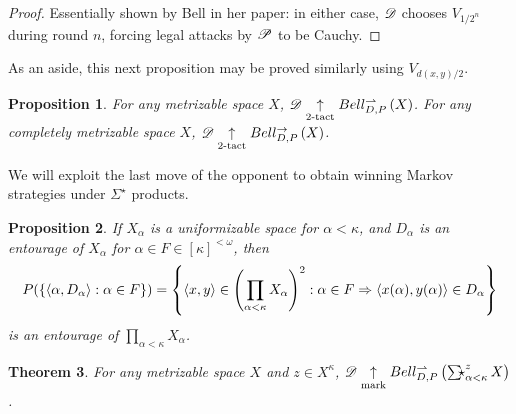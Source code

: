 \documentclass{amsart}
\newtheorem{theorem}{Theorem}[section]
\newtheorem{proposition}[theorem]{Proposition}
\theoremstyle{definition}
\begin{document}
  \begin{proof}
    Essentially shown by Bell in her paper: in either case,
    \(\mathscr{D}\) chooses \(V_{1/2^{n}}\)
    during round \(n\), forcing legal attacks by \(\mathscr{P}\) to be Cauchy.
  \end{proof}

  As an aside, this next proposition may be proved similarly
  using \(V_{d(x,y)/2}\).

  \begin{proposition}
    For any metrizable space \(X\),
    \(\mathscr{D}\underset{2\text{-tact}}{\uparrow}Bell_{D,P}^{\rightharpoonup}\left({X}\right)\).
    For any completely metrizable space \(X\),
    \(\mathscr{D}\underset{2\text{-tact}}{\uparrow}Bell_{D,P}^{\to}\left({X}\right)\).
  \end{proposition}

  We will exploit the last move of the
  opponent to obtain winning Markov strategies under
  \(\Sigma^\star\) products.

  \begin{proposition}
    If \(X_\alpha\) is a uniformizable space for \(\alpha<\kappa\),
    and \(D_\alpha\) is an entourage of \(X_\alpha\) for
    \(\alpha\in F\in[\kappa]^{<\omega}\), then
      \[
        P(\{\langle\alpha,D_\alpha\rangle:\alpha\in F\})
          =
        \left\{
          \langle x,y\rangle\in\left(\prod_{\alpha<\kappa}X_\alpha\right)^2
        :
          \alpha\in F
        \Rightarrow
          \langle x(\alpha),y(\alpha)\rangle\in D_\alpha
        \right\}
      \]
    is an entourage of \(\prod_{\alpha<\kappa}X_\alpha\).
  \end{proposition}

  \begin{theorem}
    For any metrizable space \(X\) and \(z\in X^\kappa\),
    \(\pl D\markwin\bellConGame{\SigmaStarProd_{\alpha<\kappa}^z X}\).
  \end{theorem}
\end{document}
